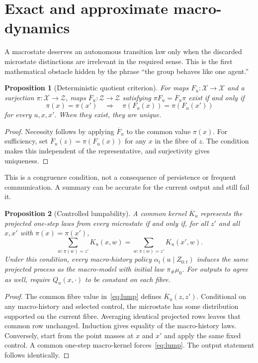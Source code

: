 \documentclass[11pt,letterpaper]{article}
\theoremstyle{plain}
\newtheorem{proposition}{Proposition}[section]
\theoremstyle{definition}
\theoremstyle{remark}
\newcommand{\X}{\mathcal X}
\newcommand{\Z}{\mathcal Z}
\newcommand{\push}{\pi_{\#}}
\begin{document}
\section{Exact and approximate macro-dynamics}\label{sec:closure}
A macrostate deserves an autonomous transition law only when the discarded microstate distinctions are irrelevant in the required sense. This is the first mathematical obstacle hidden by the phrase ``the group behaves like one agent.''

\begin{proposition}[Deterministic quotient criterion]\label{prop:det}
For maps $F_u:\X\to\X$ and a surjection $\pi:\X\to\Z$, maps $\overline F_u:\Z\to\Z$ satisfying $\pi F_u=\overline F_u\pi$ exist if and only if
\[
\pi(x)=\pi(x')\quad\Longrightarrow\quad
\pi(F_u(x))=\pi(F_u(x'))
\]
for every $u,x,x'$. When they exist, they are unique.
\end{proposition}
\begin{proof}
Necessity follows by applying $\overline F_u$ to the common value $\pi(x)$. For sufficiency, set $\overline F_u(z)=\pi(F_u(x))$ for any $x$ in the fibre of $z$. The condition makes this independent of the representative, and surjectivity gives uniqueness.
\end{proof}

This is a congruence condition, not a consequence of persistence or frequent communication. A summary can be accurate for the current output and still fail it.

\begin{proposition}[Controlled lumpability]\label{prop:lump}
A common kernel $\overline K_u$ represents the projected one-step laws from every microstate if and only if, for all $z'$ and all $x,x'$ with $\pi(x)=\pi(x')$,
\begin{equation}\label{eq:lump}
\sum_{w:\pi(w)=z'}K_u(x,w)
=\sum_{w:\pi(w)=z'}K_u(x',w).
\end{equation}
Under this condition, every macro-history policy $\alpha_t(u\mid Z_{0:t})$ induces the same projected process as the macro-model with initial law $\push\mu_0$. For outputs to agree as well, require $Q_u(x,\cdot)$ to be constant on each fibre.
\end{proposition}
\begin{proof}
The common fibre value in~\eqref{eq:lump} defines $\overline K_u(z,z')$. Conditional on any macro-history and selected control, the microstate has some distribution supported on the current fibre. Averaging identical projected rows leaves that common row unchanged. Induction gives equality of the macro-history laws. Conversely, start from the point masses at $x$ and $x'$ and apply the same fixed control. A common one-step macro-kernel forces~\eqref{eq:lump}. The output statement follows identically.
\end{proof}
\end{document}
